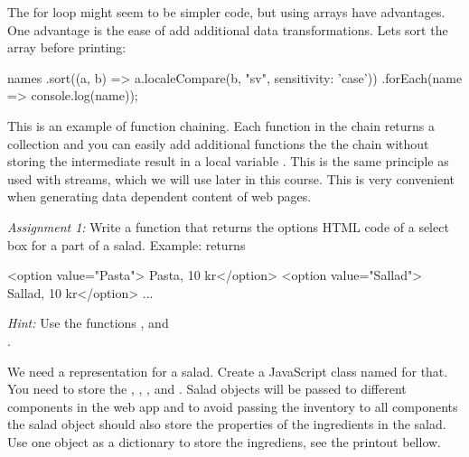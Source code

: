 \documentclass[fleqn, article, a4paper]{memoir}
\begin{document}
\begin{Assignments}
The for loop might seem to be simpler code, but using arrays have advantages. One advantage is the ease of add additional data transformations. Lets sort the array before printing:
\begin{Code}
names
.sort((a, b) => a.localeCompare(b, "sv", {sensitivity: 'case'}))
.forEach(name => console.log(name));
\end{Code}
This is an example of function chaining. Each function in the chain returns a collection and you can easily add additional functions the the chain without storing the intermediate result in a local variable . This is the same principle as used with streams, which we will use later in this course. This is very convenient when generating data dependent content of web pages.

\emph{Assignment 1:} Write a function that returns the options HTML code of a select box for a part of a salad. Example:
 returns 
\begin{Code}
<option value="Pasta"> Pasta, 10 kr</option>
<option value="Sallad"> Sallad, 10 kr</option> ...
\end{Code}
\emph{Hint:} Use the functions ,  and \\.

\item We need a representation for a salad. Create a JavaScript class named  for that. You need to store the , , , and . Salad objects will be passed to different components in the web app and to avoid passing the inventory to all components the salad object should also store the properties of the ingredients in the salad. Use one object as a dictionary to store the ingrediens, see the printout bellow.


\end{Assignments}
\end{document}
